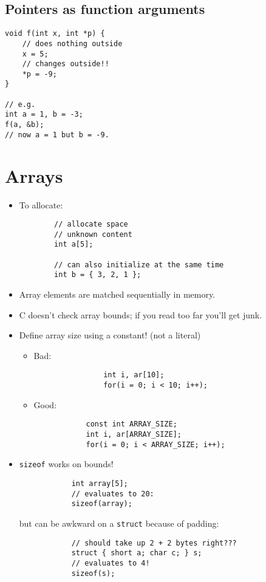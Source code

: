 \subsection{Pointers as function arguments}
\begin{verbatim}
void f(int x, int *p) {
	// does nothing outside
	x = 5;
	// changes outside!!
	*p = -9;
}

// e.g.
int a = 1, b = -3;
f(a, &b);
// now a = 1 but b = -9.
\end{verbatim}

\section{Arrays}
\begin{itemize}
	\item To allocate:
		\begin{verbatim}
		// allocate space
		// unknown content
		int a[5];
		
		// can also initialize at the same time
		int b = { 3, 2, 1 };
		\end{verbatim}
	\item Array elements are matched sequentially in memory.
	\item C doesn't check array bounds; if you read too far you'll get junk.
	\item Define array size using a constant! (not a literal)
	\begin{itemize}
		\item Bad:
			\begin{verbatim}
				int i, ar[10];
				for(i = 0; i < 10; i++);
			\end{verbatim}
		\item Good:
			\begin{verbatim}
			const int ARRAY_SIZE;
			int i, ar[ARRAY_SIZE];
			for(i = 0; i < ARRAY_SIZE; i++);
			\end{verbatim}
	\end{itemize}
	\item \texttt{sizeof} works on bounds!
		\begin{verbatim}
			int array[5];
			// evaluates to 20:
			sizeof(array);
		\end{verbatim}
		
		but can be awkward on a \texttt{struct} because of padding:
		\begin{verbatim}
			// should take up 2 + 2 bytes right???
			struct { short a; char c; } s;
			// evaluates to 4!
			sizeof(s);
		\end{verbatim}
\end{itemize}

